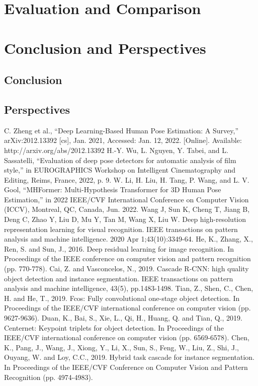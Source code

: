 \documentclass[runningheads]{llncs}
\begin{document}
\section{Evaluation and Comparison}

\section{Conclusion and Perspectives}
\subsection{Conclusion}
\subsection{Perspectives}



\begin{thebibliography}{8}
   C. Zheng et al., “Deep Learning-Based Human Pose Estimation: A Survey,” arXiv:2012.13392 [cs], Jan. 2021, Accessed: Jan. 12, 2022. [Online]. Available: http://arxiv.org/abs/2012.13392
   H.-Y. Wu, L. Nguyen, Y. Tabei, and L. Sassatelli, “Evaluation of deep pose detectors for automatic analysis of film style,” in EUROGRAPHICS Workshop on Intelligent Cinematography and Editing, Reims, France, 2022, p. 9.
   W. Li, H. Liu, H. Tang, P. Wang, and L. V. Gool, “MHFormer: Multi-Hypothesis Transformer for 3D Human Pose Estimation,” in 2022 IEEE/CVF International Conference on Computer Vision (ICCV), Montreal, QC, Canada, Jun. 2022.
   Wang J, Sun K, Cheng T, Jiang B, Deng C, Zhao Y, Liu D, Mu Y, Tan M, Wang X, Liu W. Deep high-resolution representation learning for visual recognition. IEEE transactions on pattern analysis and machine intelligence. 2020 Apr 1;43(10):3349-64.
   He, K., Zhang, X., Ren, S. and Sun, J., 2016. Deep residual learning for image recognition. In Proceedings of the IEEE conference on computer vision and pattern recognition (pp. 770-778).
   Cai, Z. and Vasconcelos, N., 2019. Cascade R-CNN: high quality object detection and instance segmentation. IEEE transactions on pattern analysis and machine intelligence, 43(5), pp.1483-1498.
   Tian, Z., Shen, C., Chen, H. and He, T., 2019. Fcos: Fully convolutional one-stage object detection. In Proceedings of the IEEE/CVF international conference on computer vision (pp. 9627-9636).
   Duan, K., Bai, S., Xie, L., Qi, H., Huang, Q. and Tian, Q., 2019. Centernet: Keypoint triplets for object detection. In Proceedings of the IEEE/CVF international conference on computer vision (pp. 6569-6578).
   Chen, K., Pang, J., Wang, J., Xiong, Y., Li, X., Sun, S., Feng, W., Liu, Z., Shi, J., Ouyang, W. and Loy, C.C., 2019. Hybrid task cascade for instance segmentation. In Proceedings of the IEEE/CVF Conference on Computer Vision and Pattern Recognition (pp. 4974-4983).
\end{thebibliography}
\end{document}
